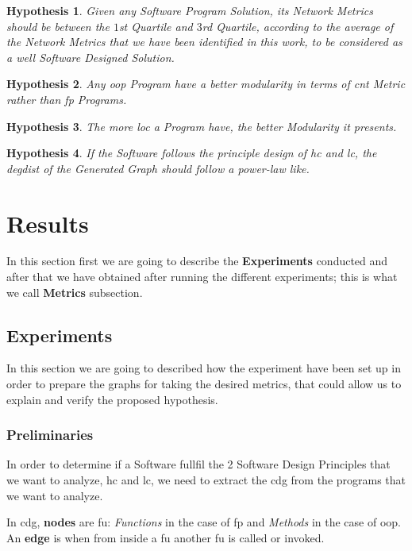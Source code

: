 \documentclass[12pt, a4paper]{article}
\newtheorem{hyp}{Hypothesis}
\begin{document}
\begin{hyp}
Given any Software Program Solution, its Network Metrics should be between the  $1$st Quartile and $3$rd Quartile, according to the average of the Network Metrics that we have been identified in this work,
to be considered as a well Software Designed Solution.
\end{hyp}

\begin{hyp}
Any \acrlong{oop} Program have a better modularity in terms of \acrlong{cnt} Metric rather than \acrlong{fp} Programs.
\end{hyp}

\begin{hyp}
The more \acrfull{loc} a Program have, the better Modularity it presents.
\end{hyp}
    
\begin{hyp}
If the Software follows the principle design of \acrshort{hc} and \acrshort{lc}, the \acrfull{degdist} of the Generated Graph should follow a power-law like.
\end{hyp}

\section{Results}
In this section first we are going to describe the \textbf{Experiments} conducted and after that we have obtained after running the different experiments; this is what we call \textbf{Metrics} subsection.

\subsection{Experiments}
In this section we are going to described how the experiment have been set up in order to prepare the graphs for taking the desired metrics, that could allow us to explain and verify the proposed hypothesis.

\subsubsection{Preliminaries}
In order to determine if a Software fullfil the 2 Software Design Principles that we want to analyze, \acrshort{hc} and \acrshort{lc}, 
we need to extract the \acrfull{cdg} from the programs that we want to analyze.

In \acrshort{cdg}, \textbf{nodes} are \acrlong{fu}: \textit{Functions} in the case of \acrshort{fp} and \textit{Methods} in the case of \acrshort{oop}.
An \textbf{edge} is when from inside a \acrshort{fu} another \acrshort{fu} is called or invoked.
\end{document}
